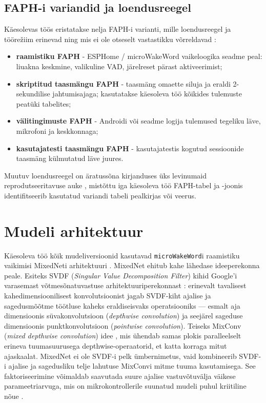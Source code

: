 \subsection{FAPH-i variandid ja loendusreegel}
\label{subsec:faph-variants}
Käesolevas töös eristatakse nelja FAPH-i varianti, mille loendusreegel ja töörežiim erinevad ning mis ei ole otseselt vastastikku võrreldavad \cite{lopezespejo2021deepkws,microwakeword2026,openwakeword2026,esphome2026}:
\begin{itemize}
    \item \textbf{raamistiku FAPH} - ESPHome / microWakeWord vaikeloogika seadme peal: liuakna keskmine, valikuline VAD, järelreset pärast aktiveerimist;
    \item \textbf{skriptitud taasmängu FAPH} - taasmäng omaette siluja ja eraldi 2-sekundilise jahtumisajaga; kasutatakse käesoleva töö kõikides tulemuste peatüki tabelites;
    \item \textbf{välitingimuste FAPH} - Androidi või seadme logija tulemused tegeliku läve, mikrofoni ja keskkonnaga;
    \item \textbf{kasutajatesti taasmängu FAPH} - kasutajatestis kogutud sessioonide taasmäng külmutatud läve juures.
\end{itemize}
Muutuv loendusreegel on äratussõna kirjanduses üks levinumaid reprodutseeritavuse auke \cite{lopezespejo2021deepkws}, mistõttu iga käesoleva töö FAPH-tabel ja -joonis identifitseerib kasutatud variandi tabeli pealkirjas või veerus.

\section{Mudeli arhitektuur}
\label{sec:model-architecture}

Käesoleva töö kõik mudeliversioonid kasutavad \texttt{microWakeWord}i raamistiku vaikimisi MixedNeti arhitektuuri \cite{microwakeword2026}. MixedNet ehitub kahe lähedase ideeperekonna peale. Esiteks SVDF (\emph{Singular Value Decomposition Filter}) kihid Google'i varasemast võtmesõnatuvastuse arhitektuuriperekonnast \cite{alvarez2019svdf}: erinevalt tavalisest kahedimensioonilisest konvolutsioonist jagab SVDF-kiht ajalise ja sagedusmõõtme töötluse kaheks eraldiseisvaks operatsiooniks --- esmalt aja dimensioonis süvakonvolutsioon (\emph{depthwise convolution}) ja seejärel sageduse dimensioonis punktkonvolutsioon (\emph{pointwise convolution}). Teiseks MixConv (\emph{mixed depthwise convolution}) idee \cite{tan2019mixconv}, mis ühendab samas plokis paralleelselt erineva tuumasuurusega depthwise-operaatorid, et katta korraga mitut ajaskaalat. MixedNet ei ole SVDF-i pelk ümbernimetus, vaid kombineerib SVDF-i ajalise ja sagedusliku telje lahutuse MixConvi mitme tuuma kasutamisega. See faktoriseerimine võimaldab saavutada suure ajalise vastuvõtuvälja väikese parameetriarvuga, mis on mikrokontrollerile suunatud mudeli puhul kriitiline nõue \cite{chen2014smallfootprint,sainath2015cnn}.

